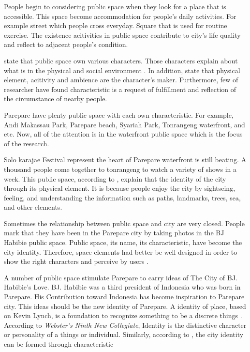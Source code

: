 \documentclass[11pt]{simart} %
\begin{document}
People begin to considering public space when they look for a place that is accessible. This space become accommodation for people's daily activities. For example street which people cross everyday. Square that is used for routine exercise. The existence acitivities in public space contribute to city's life quality and reflect to adjacent people's condition.

\cite{ahmadi2009} state that public space own various characters. Those characters explain about what is in the physical and social environment \citep{dougherty2006}. In addition, \cite{hartanti2014} state that physical element, acitivity and ambience are the character's maker. Furthermore, few of researcher have found characteristic is a request of fulfillment and reflection of the circumstance of nearby people.

Parepare have plenty public space with each own characteristic. For example, Andi Makassau Park, Parepare beach, Syariah Park, Tonrangeng waterfront, and etc. Now, all of the attention is in the waterfront public space which is the focus of the research.

Solo karajae Festival represent the heart of Parepare waterfront is still beating. A thousand people come together to tonrangeng to watch a variety of shows in a week. This public space, according to \cite{hartanti2014}, explain that the identity of the city through its physical element. It is because people enjoy the city by sightseing, feeling, and understanding the information such as paths, landmarks, trees, sea, and other elements.

Sometimes the relationship between public space and city are very closed. People mark that they have been in the Parepare city by taking photos in the BJ Habibie public space. Public space, its name, its characteristic, have become the city identity. Therefore, space elements had better be well designed in order to show the right characters and perceive by users \citep{hartanti2014}.

A number of public space stimulate Parepare to carry ideas of The City of BJ. Habibie's Love. BJ. Habibie was a third president of Indonesia who was born in Parepare. His Contribution toward Indonesia has become inspiration to Parepare city. This ideas should be the new identity of Parepare.
A identity of place, based on Kevin Lynch, is a foundation to recognize something to be a discrete things \citep{hartanti2014}. According to \textit{Webster's Ninth New Collegiate}, Identity is the distinctive character or personality of a things or individual. Similarly, according to \cite{hartanti2014}, the city identity can be formed through characteristic
\end{document}
